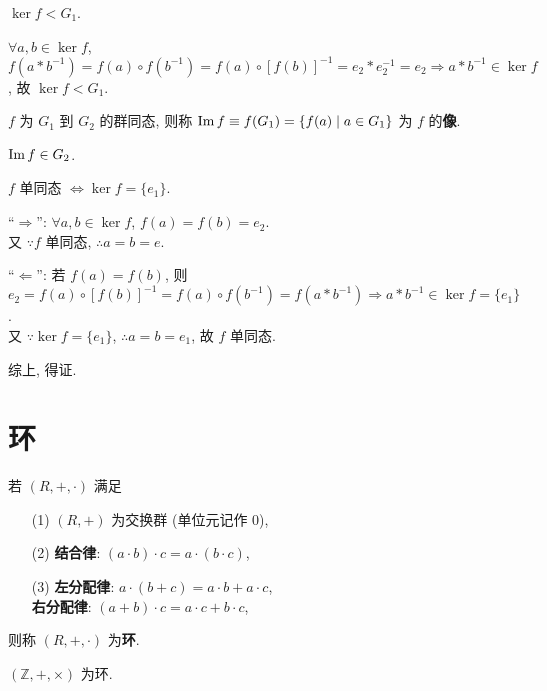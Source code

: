 \documentclass{note}
\begin{document}
$\ker f<G_1$.
\begin{pf}
    $\forall a,b\in\ker f$, $f(a*b^{-1})=f(a)\circ f(b^{-1})=f(a)\circ[f(b)]^{-1}=e_2*e_2^{-1}=e_2\Longrightarrow a*b^{-1}\in\ker f$, 故 $\ker f<G_1$.
\end{pf}

\begin{df}[群同态的像]
    $f$ 为 $G_1$ 到 $G_2$ 的群同态, 则称 $\operatorname{Im} f\equiv f(G_1)=\{f(a)\mid a\in G_1\}$ 为 $f$ 的\textbf{像}.
\end{df}

$\operatorname{Im} f\in G_2$.

\begin{thm}
    $f$ 单同态 $\Longleftrightarrow\ker f=\{e_1\}$.
\end{thm}
\begin{pf}
    ``$\Longrightarrow$'': $\forall a,b\in\ker f$, $f(a)=f(b)=e_2$.\\
    又 $\because f$ 单同态, $\therefore a=b=e$.

    ``$\Longleftarrow$'': 若 $f(a)=f(b)$, 则 $e_2=f(a)\circ[f(b)]^{-1}=f(a)\circ f(b^{-1})=f(a*b^{-1})\Longrightarrow a*b^{-1}\in\ker f=\{e_1\}$.\\
    又 $\because\ker f=\{e_1\}$, $\therefore a=b=e_1$, 故 $f$ 单同态.

    综上, 得证.
\end{pf}

\section{环}
\begin{df}[环]
    若 $(R,+,\cdot)$ 满足
    \begin{itemize}
        \item[(1)] $(R,+)$ 为交换群 (单位元记作 $0$),
        \item[(2)] \textbf{结合律}: $(a\cdot b)\cdot c=a\cdot(b\cdot c)$,
        \item[(3)] \textbf{左分配律}: $a\cdot(b+c)=a\cdot b+a\cdot c$,\\
        \textbf{右分配律}: $(a+b)\cdot c=a\cdot c+b\cdot c$,
    \end{itemize}
    则称 $(R,+,\cdot)$ 为\textbf{环}.
\end{df}

\begin{eg}
    $(\mathbb{Z},+,\times)$ 为环.
\end{eg}
\end{document}
